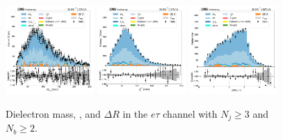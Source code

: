 \begin{figure}[htb!]
    \centering
    \includegraphics[width=0.3\textwidth]{chapters/Appendix/sectionPlots/figures/data_mc_overlays/etau_2016_cat_gt3_gt2_signal_linear_lepton_dilepton1_mass}
    \includegraphics[width=0.3\textwidth]{chapters/Appendix/sectionPlots/figures/data_mc_overlays/etau_2016_cat_gt3_gt2_signal_linear_lepton_dilepton1_pt}
    \includegraphics[width=0.3\textwidth]{chapters/Appendix/sectionPlots/figures/data_mc_overlays/etau_2016_cat_gt3_gt2_signal_linear_lepton_dilepton1_delta_r}
    \caption{Dielectron mass, \pt, and $\Delta R$ in the $e\tau$ channel
        with $N_{j} \geq 3$ and $N_{b} \geq 2$.}
    \label{fig:etau_8_dilepton}
\end{figure}


